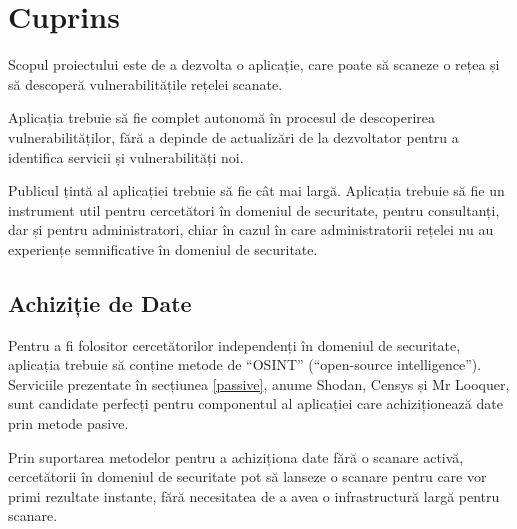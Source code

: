 \newpage

	

\newpage
\section*{Cuprins}

	\begingroup
	\renewcommand{\section}[2]{}
	\hypersetup{linkcolor=lightblue}
	\romaniantableofcontents
	\endgroup

\newpage
\pagestyle{fancy}
\section*{Scopul Proiectului}

	Scopul proiectului este de a dezvolta o aplicație, care poate să scaneze o rețea și să descoperă vulnerabilitățile rețelei scanate.

	Aplicația trebuie să fie complet autonomă în procesul de descoperirea vulnerabilităților, fără a depinde de actualizări de la dezvoltator pentru a identifica servicii și vulnerabilități noi.

	Publicul țintă al aplicației trebuie să fie cât mai largă. Aplicația trebuie să fie un instrument util pentru cercetători în domeniul de securitate, pentru consultanți, dar și pentru administratori, chiar în cazul în care administratorii rețelei nu au experiențe semnificative în domeniul de securitate.

\subsection*{Achiziție de Date}

	Pentru a fi folositor cercetătorilor independenți în domeniul de securitate, aplicația trebuie să conține metode de ``OSINT'' (``open-source intelligence''). Serviciile prezentate în secțiunea \ref{passive}, anume Shodan\cite{shodan16}, Censys\cite{censys15} și Mr Looquer\cite{looquer16}, sunt candidate perfecți pentru componentul al aplicației care achiziționează date prin metode pasive.
	
	Prin suportarea metodelor pentru a achiziționa date fără o scanare activă, cercetătorii în domeniul de securitate pot să lanseze o scanare pentru care vor primi rezultate instante, fără necesitatea de a avea o infrastructură largă pentru scanare.
	
